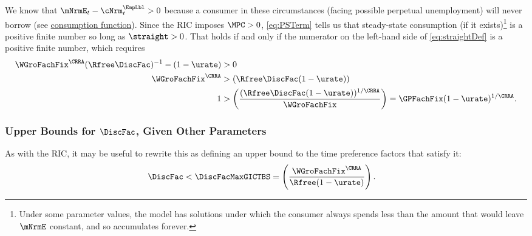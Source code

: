 \documentclass{econark}
\begin{document}
We know that $\mNrmE_{t}-{\cNrm}^{\EmpLbl}_{t} > 0$ because a consumer in these circumstances (facing possible perpetual unemployment) will never borrow (see \hyperref[fig:cFunc]{consumption function}).  Since the RIC imposes $\MPC>0$, \eqref{eq:PSTerm} tells us that steady-state consumption (if it exists)\footnote{Under some parameter values, the model has solutions under which the consumer always spends less than the amount that would leave $\mNrmE$ constant, and so accumulates forever.} is a positive finite number so long as $\straight > 0$. That holds if and only if the numerator on the left-hand side of \eqref{eq:straightDef} is a positive finite number, which requires
\begin{equation}\begin{gathered}\begin{aligned}
        \WGroFachFix^{\CRRA}(\Rfree\DiscFac)^{-1}-(1-\urate) & >  0  \\
       \WGroFachFix^{\CRRA} & >  (\Rfree \DiscFac (1-\urate))
\\     1 & >  \left(\frac{(\Rfree \DiscFac (1-\urate))^{1/\CRRA}}{\WGroFachFix}\right) = \GPFachFix (1-\urate)^{1/\CRRA} \label{eq:GICExistsSoln}
.\end{aligned}\end{gathered}\end{equation}

\hypertarget{GIFMax}{}\hypertarget{DiscountMaxGICTBS}{}

\subsubsection{Upper Bounds for $\DiscFac$, Given Other Parameters}


As with the RIC, it may be useful to rewrite this as defining an upper bound to the time preference factors that satisfy it: 
\begin{equation}\begin{gathered}\begin{aligned}
\DiscFac < \DiscFacMaxGICTBS & =  \left(\frac{\WGroFachFix^{\CRRA}}{\Rfree(1-\urate)}\right) \label{eq:DiscountMaxGICTBS}
.
\end{aligned}\end{gathered}\end{equation}
\end{document}
